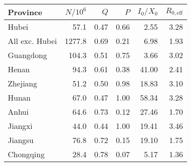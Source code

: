 \begin{tabular}{lrrrrr}
\hline
 Province       &   $N/10^6$ &   $Q$ &   $P$ &   $I_0/X_0$ &   $R_{0,\mathrm{eff}}$ \\
\hline
 Hubei          &       57.1 &  0.47 &  0.66 &        2.55 &                   3.28 \\
 All exc. Hubei &     1277.8 &  0.69 &  0.21 &        6.98 &                   1.93 \\
 Guangdong      &      104.3 &  0.51 &  0.75 &        3.66 &                   3.02 \\
 Henan          &       94.3 &  0.61 &  0.38 &       41.00 &                   2.41 \\
 Zhejiang       &       51.2 &  0.50 &  0.98 &       18.83 &                   3.10 \\
 Hunan          &       67.0 &  0.47 &  1.00 &       58.34 &                   3.28 \\
 Anhui          &       64.6 &  0.73 &  0.12 &       27.46 &                   1.70 \\
 Jiangxi        &       44.0 &  0.44 &  1.00 &       19.41 &                   3.46 \\
 Jiangsu        &       76.8 &  0.72 &  0.15 &       19.10 &                   1.75 \\
 Chongqing      &       28.4 &  0.78 &  0.07 &        5.17 &                   1.36 \\
\hline
\end{tabular}